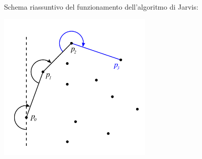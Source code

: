 \documentclass[../cheatSheetAlgoritmi.tex]{subfiles}
\begin{document}
Schema riassuntivo del funzionamento dell'algoritmo di Jarvis:
\begin{center}
	\includegraphics{ ../img/backtracking_inviluppo_convesso_jarvis}
\end{center}
\end{document}
